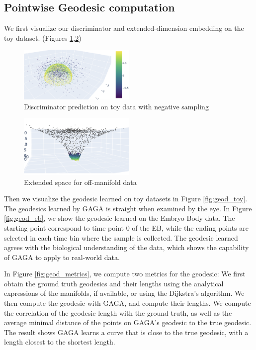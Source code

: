\documentclass{article}
\theoremstyle{plain}
\theoremstyle{definition}
\theoremstyle{remark}
\newcommand{\methodshort}{GAGA\xspace}
\begin{document}
\subsection{Pointwise Geodesic computation}
\par We first visualize our discriminator and extended-dimension embedding on the toy dataset. (Figures \ref{fig:discriminator},\ref{fig:offmfdr})
\begin{figure}[htbp]
    \centering
    \includegraphics[width=0.5\textwidth]{fig/discriminator.png}
    \caption{Discriminator prediction on toy data with negative sampling}
    \label{fig:discriminator}
\end{figure}

\begin{figure}[htbp]
    \centering
    \includegraphics[width=0.5\textwidth]{fig/offmfdr.png}
    \caption{Extended space for off-manifold data}
    \label{fig:offmfdr}
\end{figure}

\par Then we visualize the geodesic learned on toy datasets in Figure \ref{fig:geod_toy}. The geodesics learned by \methodshort is straight when examined by the eye. In Figure \ref{fig:geod_eb}, we show the geodesic learned on the Embryo Body data. The starting point correspond to time point 0 of the EB, while the ending points are selected in each time bin where the sample is collected. The geodesic learned agrees with the biological understanding of the data, which shows the capability of \methodshort to apply to real-world data.
\par In Figure \ref{fig:geod_metrics}, we compute two metrics for the geodesic: We first obtain the ground truth geodesics and their lengths using the analytical expressions of the manifolds, if available, or using the Dijkstra's algorithm. We then compute the geodesic with \methodshort, and compute their lengths. We compute the correlation of the geodesic length with the ground truth, as well as the average minimal distance of the points on \methodshort's geodesic to the true geodesic. The result shows \methodshort learns a curve that is close to the true geodesic, with a length closest to the shortest length.
\end{document}
